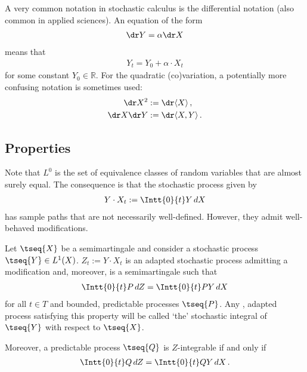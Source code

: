     \begin{notation}[Differential]
        A very common notation in stochastic calculus is the differential notation (also common in applied sciences). An equation of the form
        \begin{gather}
            \dr Y = \alpha\dr X
        \end{gather}
        means that
        \begin{gather}
            Y_t = Y_0 + \alpha\cdot X_t
        \end{gather}
        for some constant $Y_0\in\mathbb{R}$. For the quadratic (co)variation, a potentially more confusing notation is sometimes used:
        \begin{gather}
            \begin{aligned}
                \dr X^2 &:= \dr\langle X \rangle\,,\\
                \dr X\dr Y &:= \dr\langle X,Y \rangle\,.
            \end{aligned}
        \end{gather}
    \end{notation}

\subsection{Properties}

    Note that $L^0$ is the set of equivalence classes of random variables that are almost surely equal. The consequence is that the stochastic process given by
    \begin{gather}
        Y\cdot X_t := \Intt{0}{t}Y\,dX
    \end{gather}
    has sample paths that are not necessarily well-defined. However, they admit well-behaved modifications.
    \begin{property}
        Let $\tseq{X}$ be a semimartingale and consider a stochastic process $\tseq{Y}\in L^1(X)$. $Z_t := Y\cdot X_t$ is an adapted stochastic process admitting a \cdlg modification and, moreover, is a semimartingale such that
        \begin{gather}
            \Intt{0}{t}P\,dZ = \Intt{0}{t}PY\,dX
        \end{gather}
        for all $t\in T$ and bounded, predictable processes $\tseq{P}$. Any \cdlgg, adapted process satisfying this property will be called `the' stochastic integral of $\tseq{Y}$ with respect to $\tseq{X}$.

        Moreover, a predictable process $\tseq{Q}$ is $Z$-integrable if and only if
        \begin{gather}
            \Intt{0}{t}Q\,dZ = \Intt{0}{t}QY\,dX\,.
        \end{gather}
    \end{property}


